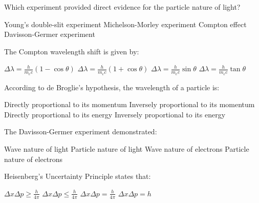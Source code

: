 \begin{question}[2]
Which experiment provided direct evidence for the particle nature of light?

\begin{oneparcheckboxes}
\choice Young's double-slit experiment
\choice Michelson-Morley experiment
\correctchoice Compton effect
\choice Davisson-Germer experiment
\end{oneparcheckboxes}
\end{question}

\begin{question}[2]
The Compton wavelength shift is given by:

\begin{oneparcheckboxes}
\correctchoice $\displaystyle \Delta\lambda = \frac{h}{m_ec}(1-\cos\theta)$
\choice $\displaystyle \Delta\lambda = \frac{h}{m_ec}(1+\cos\theta)$
\choice $\displaystyle \Delta\lambda = \frac{h}{m_ec}\sin\theta$
\choice $\displaystyle \Delta\lambda = \frac{h}{m_ec}\tan\theta$
\end{oneparcheckboxes}
\end{question}

\begin{question}[2]
According to de Broglie's hypothesis, the wavelength of a particle is:

\begin{oneparcheckboxes}
\choice Directly proportional to its momentum
\correctchoice Inversely proportional to its momentum
\choice Directly proportional to its energy
\choice Inversely proportional to its energy
\end{oneparcheckboxes}
\end{question}

\begin{question}[2]
The Davisson-Germer experiment demonstrated:

\begin{oneparcheckboxes}
\choice Wave nature of light
\choice Particle nature of light
\correctchoice Wave nature of electrons
\choice Particle nature of electrons
\end{oneparcheckboxes}
\end{question}

\begin{question}[2]
Heisenberg's Uncertainty Principle states that:

\begin{oneparcheckboxes}
\correctchoice $\displaystyle \Delta x \Delta p \geq \frac{h}{4\pi}$
\choice $\displaystyle \Delta x \Delta p \leq \frac{h}{4\pi}$
\choice $\displaystyle \Delta x \Delta p = \frac{h}{4\pi}$
\choice $\displaystyle \Delta x \Delta p = h$
\end{oneparcheckboxes}
\end{question}

